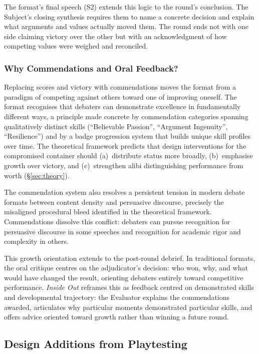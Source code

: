 The format's final speech (S2) extends this logic to the round's conclusion. The Subject's closing synthesis requires them to name a concrete decision and explain what arguments and values actually moved them. The round ends not with one side claiming victory over the other but with an acknowledgment of how competing values were weighed and reconciled.

\subsubsection{Why Commendations and Oral Feedback?}

Replacing scores and victory with commendations moves the format from a paradigm of competing against others toward one of improving oneself. The format recognises that debaters can demonstrate excellence in fundamentally different ways, a principle made concrete by commendation categories spanning qualitatively distinct skills (``Believable Passion'', ``Argument Ingenuity'', ``Resilience'') and by a badge progression system that builds unique skill profiles over time. The theoretical framework predicts that design interventions for the compromised container should (a)~distribute status more broadly, (b)~emphasise growth over victory, and (c)~strengthen alibi distinguishing performance from worth (§\ref{sec:theory}).

The commendation system also resolves a persistent tension in modern debate formats between content density and persuasive discourse, precisely the misaligned procedural bleed identified in the theoretical framework. Commendations dissolve this conflict: debaters can pursue recognition for persuasive discourse in some speeches and recognition for academic rigor and complexity in others.

This growth orientation extends to the post-round debrief. In traditional formats, the oral critique centres on the adjudicator's decision: who won, why, and what would have changed the result, orienting debaters entirely toward competitive performance. \emph{Inside Out} reframes this as feedback centred on demonstrated skills and developmental trajectory: the Evaluator explains the commendations awarded, articulates why particular moments demonstrated particular skills, and offers advice oriented toward growth rather than winning a future round.

\subsection{Design Additions from Playtesting}

